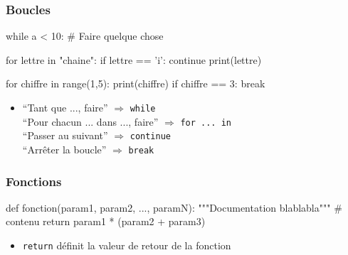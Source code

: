 \documentclass{beamer}
\let\oldsubsubsection\subsubsection
\renewcommand{\subsubsection}[2][]{\def\currentsubsubsection{#2}\oldsubsubsection[#1]{#2}}
\begin{document}
\subsubsection{Boucles}

\begin{code}{\codeboxa}
while a < 10:
    # Faire quelque chose
\end{code}
\begin{code}{\codeboxb}
for lettre in "chaine":
    if lettre == 'i':
        continue
    print(lettre)
\end{code}
\begin{code}{\codeboxc}
for chiffre in range(1,5):
    print(chiffre)
    if chiffre == 3:
        break
\end{code}
\begin{frame}
   \begin{itemize}
  \item ``Tant que ..., faire'' $\Rightarrow$ \lstinline{while}\\
    ``Pour chacun ... dans ..., faire'' $\Rightarrow$ \lstinline{for ... in}\\
    ``Passer au suivant'' $\Rightarrow$ \lstinline{continue}\\
    ``Arrêter la boucle'' $\Rightarrow$ \lstinline{break}\\[1cm]
  \end{itemize}
  \begin{overprint}
    \usebox\codeboxa
    \usebox\codeboxb
    \usebox\codeboxc
  \end{overprint}
\end{frame}

\subsubsection{Fonctions}

\begin{code}{\codebox}
def fonction(param1, param2, ..., paramN):
    """Documentation
    blablabla"""
    # contenu
    return param1 * (param2 + param3)
\end{code}

\begin{frame}
  \begin{itemize}
  \item \lstinline{return} définit la valeur de retour de la fonction\\[1cm]
  \end{itemize}
  \usebox\codebox
\end{frame}
\end{document}
